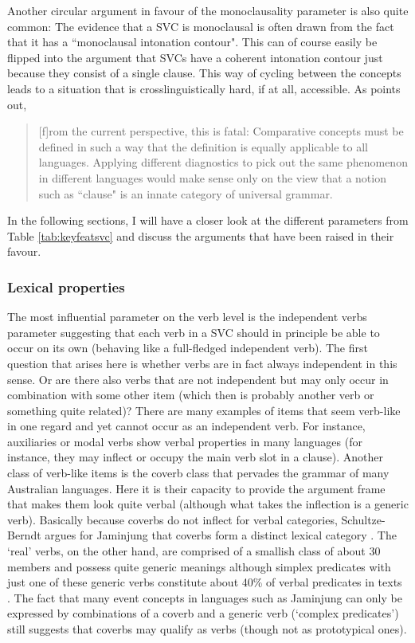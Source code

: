 Another circular argument in favour of the monoclausality parameter is also quite common: The evidence that a SVC is monoclausal is often drawn from the fact that it has a ``monoclausal intonation contour". This can of course easily be flipped into the argument that SVCs have a coherent intonation contour just because they consist of a single clause. This way of cycling between the concepts leads to a situation that is crosslinguistically hard, if at all, accessible. As \citet[299]{haspelmath2016serial} points out, 
\begin{quote}[f]rom the current perspective, this is fatal: Comparative concepts must be defined in such a way that the definition is equally applicable to all languages. Applying different diagnostics to pick out the same phenomenon in different languages would make sense only on the view that a notion such as ``clause" is an innate category of universal grammar.\end{quote}

In the following sections, I will have a closer look at the different parameters from Table \ref{tab:keyfeatsvc} and discuss the arguments that have been raised in their favour.

\subsubsection{Lexical properties}\label{sec:lexprop}

The most influential parameter on the verb level is the independent verbs parameter suggesting that each verb in a SVC should in principle be able to occur on its own (behaving like a full-fledged independent verb). The first question that arises here is whether verbs are in fact always independent in this sense. Or are there also verbs that are not independent but may only occur in combination with some other item (which then is probably another verb or something quite related)? There are many examples of items that seem verb-like in one regard and yet cannot occur as an independent verb. For instance, auxiliaries or modal verbs show verbal properties in many languages (for instance, they may inflect or occupy the main verb slot in a clause). Another class of verb-like items is the coverb class that pervades the grammar of many Australian languages. Here it is their capacity to provide the argument frame that makes them look quite verbal (although what takes the inflection is a generic verb). Basically because coverbs do not inflect for verbal categories, Schultze-Berndt argues for Jaminjung that coverbs form a distinct lexical category \citep[71]{schultze2000simple}. The `real' verbs, on the other hand, are comprised of a smallish class of about 30 members and possess quite generic meanings although simplex predicates with just one of these generic verbs constitute about 40\% of verbal predicates in texts \citep[118]{schultze2000simple}. The fact that many event concepts in languages such as Jaminjung can only be expressed by combinations of a coverb and a generic verb (`complex predicates') still suggests that coverbs may qualify as verbs (though not as prototypical ones).


